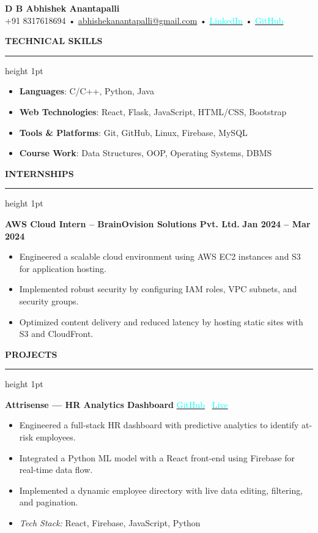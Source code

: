 \documentclass[10pt,a4paper]{article}
\newenvironment{tightitemize}{
  \begin{itemize}[leftmargin=25pt, itemsep=2pt, parsep=2pt, topsep=2pt, partopsep=0pt]
  \addtolength{\leftskip}{14pt} %
}{
  \end{itemize}
}
\newcommand{\compactspace}{\vspace{5pt}}
\newcommand{\sectiongap}{\vspace{10pt}}
\newcommand{\header}[2]{
    \begin{center}
        {\Huge \textbf{#1}} \\
        \compactspace
        {\normalsize #2}
    \end{center}
}
\newcommand{\resumesection}[1]{
    \sectiongap
    {\color{primary} \large \textbf{#1}} \\
    \hrule height 1pt \compactspace
}
\begin{document}

\header{D B Abhishek Anantapalli}
{+91 8317618694 \hspace{8pt}• \href{mailto:abhishekanantapalli@gmail.com}{abhishekanantapalli@gmail.com} \hspace{8pt}•  
\href{https://www.linkedin.com/in/abhishekanantapalli/}{\textcolor{cyan}{LinkedIn}} \hspace{8pt}•  
\href{https://github.com/AbhiAnantapalli215}{\textcolor{cyan}{GitHub}}}
\resumesection{TECHNICAL SKILLS}
\begin{itemize}
    \item \textbf{Languages}: C/C++, Python, Java
    \item \textbf{Web Technologies}: React, Flask, JavaScript, HTML/CSS, Bootstrap
    \item \textbf{Tools \& Platforms}: Git, GitHub, Linux, Firebase, MySQL
    \item \textbf{Course Work}: Data Structures, OOP, Operating Systems, DBMS
\end{itemize}

\resumesection{INTERNSHIPS}
\textbf{AWS Cloud Intern – BrainOvision Solutions Pvt. Ltd.} \hfill \textbf{Jan 2024 -- Mar 2024}
\begin{tightitemize}
    \item Engineered a scalable cloud environment using AWS EC2 instances and S3 for application hosting.
    \item Implemented robust security by configuring IAM roles, VPC subnets, and security groups.
    \item Optimized content delivery and reduced latency by hosting static sites with S3 and CloudFront.
\end{tightitemize}

\resumesection{PROJECTS}

\textbf{Attrisense — HR Analytics Dashboard} \hfill  
\href{https://github.com/AbhiAnantapalli215/Attrisense}{\textcolor{cyan}{GitHub}} \textbar\  
\href{https://attrisense.web.app}{\textcolor{cyan}{Live}}
\begin{tightitemize}
    \item Engineered a full-stack HR dashboard with predictive analytics to identify at-risk employees.
    \item Integrated a Python ML model with a React front-end using Firebase for real-time data flow.
    \item Implemented a dynamic employee directory with live data editing, filtering, and pagination.
    \item \textit{Tech Stack:} React, Firebase, JavaScript, Python
\end{tightitemize}
\end{document}
